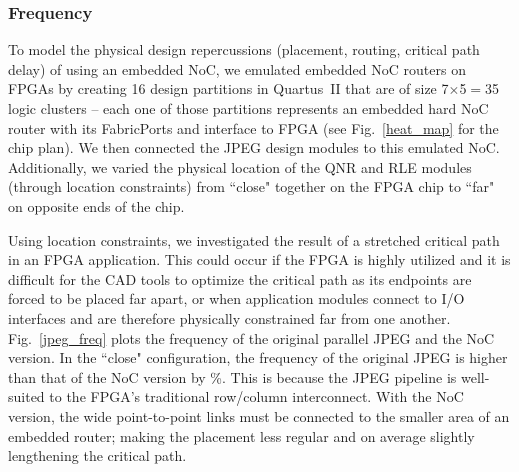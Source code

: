 \subsubsection{Frequency}

To model the physical design repercussions (placement, routing, critical path delay) of using an embedded NoC, we emulated embedded NoC routers on FPGAs by creating 16 design partitions in Quartus~II that are of size 7$\times$5$=$35 logic clusters -- each one of those partitions represents an embedded hard NoC router with its FabricPorts and interface to FPGA (see Fig.~\ref{heat_map} for the chip plan).
We then connected the JPEG design modules to this emulated NoC.
Additionally, we varied the physical location of the QNR and RLE modules (through location constraints) from ``close" together on the FPGA chip to ``far" on opposite ends of the chip.

%
%

Using location constraints, we investigated the result of a stretched critical path in an FPGA application.
This could occur if the FPGA is highly utilized and it is difficult for the CAD tools to optimize the critical path as its endpoints are forced to be placed far apart, or when application modules connect to I/O interfaces and are therefore physically constrained far from one another.
Fig.~\ref{jpeg_freq} plots the frequency of the original parallel JPEG and the NoC version.
In the ``close" configuration, the  frequency of the original JPEG is higher than that of the NoC version by \%.
This is because the JPEG pipeline is well-suited to the FPGA's traditional row/column interconnect.
With the NoC version, the wide point-to-point links must be connected to the smaller area of an embedded router; making the placement less regular and on average slightly lengthening the critical path.

%
%

